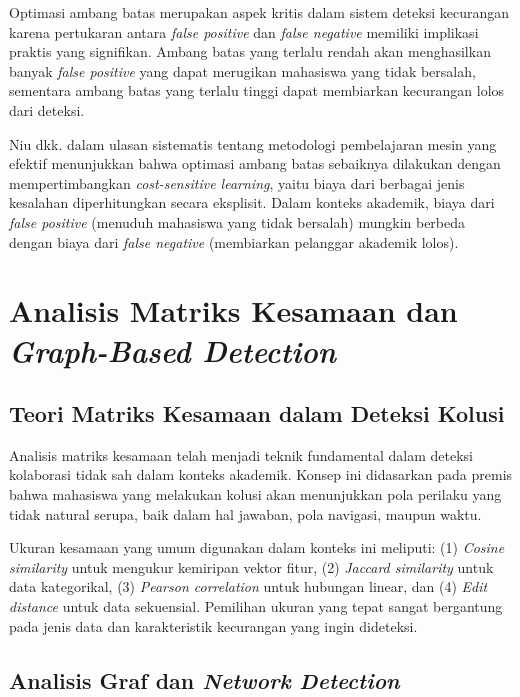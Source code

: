 Optimasi ambang batas merupakan aspek kritis dalam sistem deteksi kecurangan karena pertukaran antara \textit{false positive} dan \textit{false negative} memiliki implikasi praktis yang signifikan. Ambang batas yang terlalu rendah akan menghasilkan banyak \textit{false positive} yang dapat merugikan mahasiswa yang tidak bersalah, sementara ambang batas yang terlalu tinggi dapat membiarkan kecurangan lolos dari deteksi.

Niu dkk. \cite{Niu2025} dalam ulasan sistematis tentang metodologi pembelajaran mesin yang efektif menunjukkan bahwa optimasi ambang batas sebaiknya dilakukan dengan mempertimbangkan \textit{cost-sensitive learning}, yaitu biaya dari berbagai jenis kesalahan diperhitungkan secara eksplisit. Dalam konteks akademik, biaya dari \textit{false positive} (menuduh mahasiswa yang tidak bersalah) mungkin berbeda dengan biaya dari \textit{false negative} (membiarkan pelanggar akademik lolos).

\section{Analisis Matriks Kesamaan dan \textit{Graph-Based Detection}}
\label{sec:similarityAnalysis}

\subsection{Teori Matriks Kesamaan dalam Deteksi Kolusi}

Analisis matriks kesamaan telah menjadi teknik fundamental dalam deteksi kolaborasi tidak sah dalam konteks akademik. Konsep ini didasarkan pada premis bahwa mahasiswa yang melakukan kolusi akan menunjukkan pola perilaku yang tidak natural serupa, baik dalam hal jawaban, pola navigasi, maupun waktu.

Ukuran kesamaan yang umum digunakan dalam konteks ini meliputi: (1) \textit{Cosine similarity} untuk mengukur kemiripan vektor fitur, (2) \textit{Jaccard similarity} untuk data kategorikal, (3) \textit{Pearson correlation} untuk hubungan linear, dan (4) \textit{Edit distance} untuk data sekuensial. Pemilihan ukuran yang tepat sangat bergantung pada jenis data dan karakteristik kecurangan yang ingin dideteksi.

\subsection{Analisis Graf dan \textit{Network Detection}}

